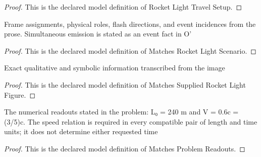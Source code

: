 \begin{proof}
  This is the declared model definition of Rocket Light Travel Setup.
\end{proof}
\begin{definition}
  \label{def:physics:phyx-mini-0568:phyxminiproblems-problemphyxmini0568-matchesrocketlightscenario}
  Frame assignments, physical roles, flash directions, and event incidences from the prose. Simultaneous emission is stated as an event fact in O'
\end{definition}
\begin{proof}
  This is the declared model definition of Matches Rocket Light Scenario.
\end{proof}
\begin{definition}
  \label{def:physics:phyx-mini-0568:phyxminiproblems-problemphyxmini0568-matchessuppliedrocketlightfigure}
  Exact qualitative and symbolic information transcribed from the image
\end{definition}
\begin{proof}
  This is the declared model definition of Matches Supplied Rocket Light Figure.
\end{proof}
\begin{definition}
  \label{def:physics:phyx-mini-0568:phyxminiproblems-problemphyxmini0568-matchesproblemreadouts}
  The numerical readouts stated in the problem: L₀ = 240 m and V = 0.6c = (3/5)c. The speed relation is required in every compatible pair of length and time units; it does not determine either requested time
\end{definition}
\begin{proof}
  This is the declared model definition of Matches Problem Readouts.
\end{proof}
